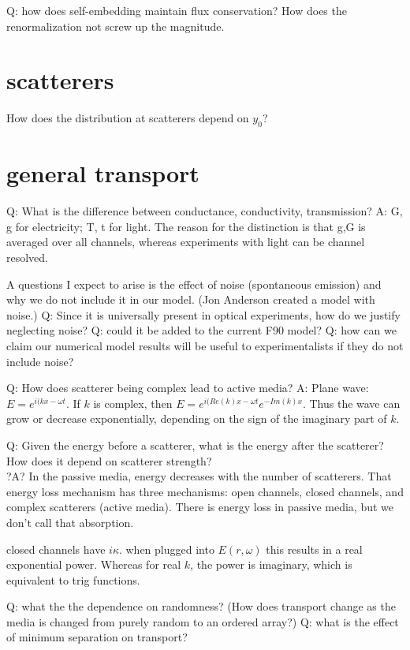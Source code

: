 \documentclass[12pt]{report} %
\begin{document}
Q: how does self-embedding maintain flux conservation? How does the renormalization not screw up the magnitude.

\section{scatterers}
How does the distribution at scatterers depend on $y_0$?

\section{general transport}
Q: What is the difference between conductance, conductivity, transmission?
A: G, g for electricity; T, t for light. The reason for the distinction is that g,G is averaged over all channels, whereas experiments with light can be channel resolved.


A questions I expect to arise is the effect of noise (spontaneous emission) and why we do not include it in our model. (Jon Anderson created a model with noise.) 
Q: Since it is universally present in optical experiments, how do we justify neglecting noise?
Q: could it be added to the current F90 model?
Q: how can we claim our numerical model results will be useful to experimentalists if they do not include noise?


Q: How does scatterer being complex lead to active media?
A: Plane wave: $E = e^{i(kx-\omega t}$. If $k$ is complex, then $E = e^{i(Re(k)x-\omega t}e^{-Im(k)x}$. Thus the wave can grow or decrease exponentially, depending on the sign of the imaginary part of $k$.


Q: Given the energy before a scatterer, what is the energy after the scatterer? How does it depend on scatterer strength? \\
?A? In the passive media, energy decreases with the number of scatterers. That energy loss mechanism has three mechanisms: open channels, closed channels, and complex scatterers (active media).  There is energy loss in passive media, but we don't call that absorption.

closed channels have $i \kappa$. when plugged into $E(r,\omega)$ this results in a real exponential power. Whereas for real $k$, the power is imaginary, which is equivalent to trig functions.


Q: what the the dependence on randomness? (How does transport change as the media is changed from purely random to an ordered array?)
Q: what is the effect of minimum separation on transport?
\end{document}
